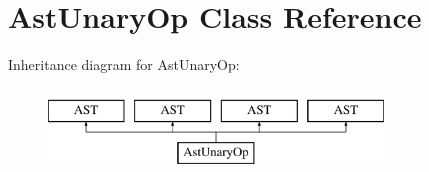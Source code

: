 \hypertarget{classAstUnaryOp}{\section{Ast\-Unary\-Op Class Reference}
\label{classAstUnaryOp}
}
Inheritance diagram for Ast\-Unary\-Op\-:\begin{figure}[H]
\begin{center}
\leavevmode
\includegraphics[height=2.000000cm]{classAstUnaryOp}
\end{center}
\end{figure}
